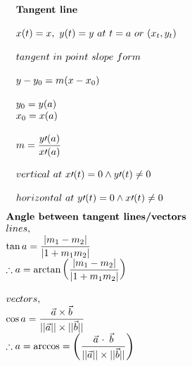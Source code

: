 \documentclass{article}
\begin{document}
\setlength{\columnsep}{0.5cm}
\begin{multicols}{2}
    \noindent 
    \[
    \begin{array}{>{\displaystyle}l}
        \textbf{Tangent\ line}\\
        \\
        x( t) =x, \ y( t) =y \ at\ t=a\ or\ ( x_t, y_t)\\
        \\
        tangent\ in\ point\ slope\ form\ \\
        \\
        y-y_{0} =m( x-x_{0})\\
        \\
        y_{0} =y( a)\\
        x_{0} =x( a)\\
        \\
        m=\frac{y\prime ( a)}{x\prime ( a)}\\
        \\
        vertical\ at\ x\prime ( t) =0\land y\prime ( t) \neq 0\ \\
        \\
        horizontal\ at\ y\prime ( t) =0\land x\prime ( t) \neq 0
    \end{array}
    \]
    \columnbreak
    \noindent 
    \[
    \begin{array}{>{\displaystyle}l}
        \textbf{Angle\ between\ tangent\ lines/vectors}\\
        lines, \\
        \tan a=\frac{|m_{1} -m_{2} |}{|1+m_{1} m_{2} |}\\
        \therefore a=\arctan\left(\frac{|m_{1} -m_{2} |}{|1+m_{1} m_{2} |}\right)\\
        \\
        vectors, \ \\
        \cos a=\frac{\vec{a} \times \vec{b}}{||\vec{a} ||\times ||\vec{b} ||}\\
        \therefore a=\arccos=\left(\frac{\vec{a}\ \cdotp\ \vec{b}}{||\vec{a} ||\times ||\vec{b} ||}\right)\\
    \end{array}
    \]
\end{multicols}
\end{document}
